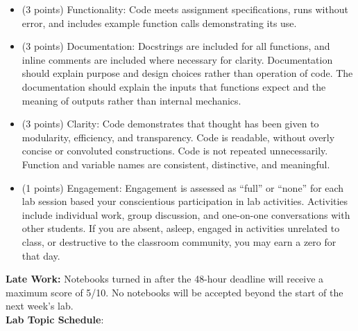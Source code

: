 \documentclass[12pt,letterpaper]{article}
\begin{document}
\begin{itemize}
	\item (3 points) Functionality: Code meets assignment specifications, runs without error, and includes example function calls demonstrating its use.

	\item (3 points) Documentation: Docstrings are included for all functions, and inline comments are included where necessary for clarity. Documentation should explain purpose and design choices rather than operation of code. The documentation should explain the inputs that functions expect and the meaning of outputs rather than internal mechanics.  

	\item (3 points) Clarity: Code demonstrates that thought has been given to modularity, efficiency, and transparency. Code is readable, without overly concise or convoluted constructions.  Code is not repeated unnecessarily.  Function and variable names are consistent, distinctive, and meaningful. 

	\item (1 points) Engagement: Engagement is assessed as “full” or “none” for each lab session based your conscientious participation in lab activities. Activities include individual work, group discussion, and one-on-one conversations with other students. If you are absent, asleep, engaged in activities unrelated to class, or destructive to the classroom community, you may earn a zero for that day.
	
\end{itemize}

\textbf {\large Late Work:}
Notebooks turned in after the 48-hour deadline will receive a maximum score of 5/10.
No notebooks will be accepted beyond the start of the next week's lab.\\

\textbf {\large Lab Topic Schedule}:
\end{document}
